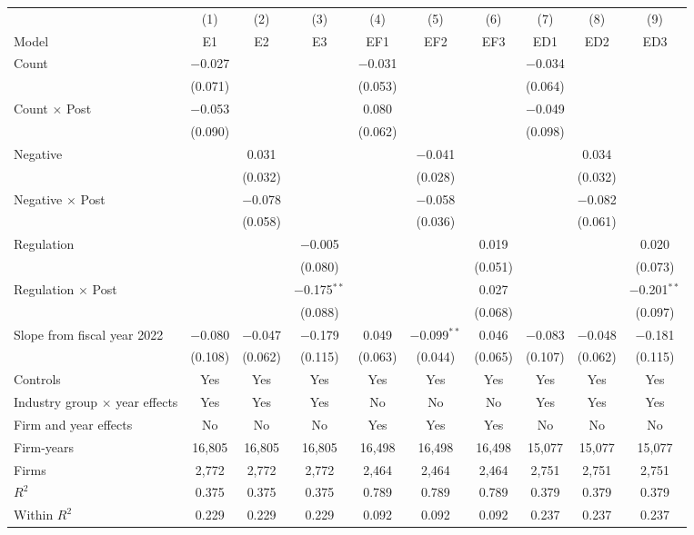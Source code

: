 \begin{tabular}{lccccccccc}
\toprule
 & (1) & (2) & (3) & (4) & (5) & (6) & (7) & (8) & (9) \\
Model & E1 & E2 & E3 & EF1 & EF2 & EF3 & ED1 & ED2 & ED3 \\
\midrule
Count & $-$0.027 &  &  & $-$0.031 &  &  & $-$0.034 &  &  \\
 & (0.071) &  &  & (0.053) &  &  & (0.064) &  &  \\
Count $\times$ Post & $-$0.053 &  &  & 0.080 &  &  & $-$0.049 &  &  \\
 & (0.090) &  &  & (0.062) &  &  & (0.098) &  &  \\
Negative &  & 0.031 &  &  & $-$0.041 &  &  & 0.034 &  \\
 &  & (0.032) &  &  & (0.028) &  &  & (0.032) &  \\
Negative $\times$ Post &  & $-$0.078 &  &  & $-$0.058 &  &  & $-$0.082 &  \\
 &  & (0.058) &  &  & (0.036) &  &  & (0.061) &  \\
Regulation &  &  & $-$0.005 &  &  & 0.019 &  &  & 0.020 \\
 &  &  & (0.080) &  &  & (0.051) &  &  & (0.073) \\
Regulation $\times$ Post &  &  & $-$0.175$^{**}$ &  &  & 0.027 &  &  & $-$0.201$^{**}$ \\
 &  &  & (0.088) &  &  & (0.068) &  &  & (0.097) \\
\addlinespace
Slope from fiscal year 2022 & $-$0.080 & $-$0.047 & $-$0.179 & 0.049 & $-$0.099$^{**}$ & 0.046 & $-$0.083 & $-$0.048 & $-$0.181 \\
 & (0.108) & (0.062) & (0.115) & (0.063) & (0.044) & (0.065) & (0.107) & (0.062) & (0.115) \\
\midrule
Controls & Yes & Yes & Yes & Yes & Yes & Yes & Yes & Yes & Yes \\
Industry group $\times$ year effects & Yes & Yes & Yes & No & No & No & Yes & Yes & Yes \\
Firm and year effects & No & No & No & Yes & Yes & Yes & No & No & No \\
Firm-years & 16,805 & 16,805 & 16,805 & 16,498 & 16,498 & 16,498 & 15,077 & 15,077 & 15,077 \\
Firms & 2,772 & 2,772 & 2,772 & 2,464 & 2,464 & 2,464 & 2,751 & 2,751 & 2,751 \\
$R^2$ & 0.375 & 0.375 & 0.375 & 0.789 & 0.789 & 0.789 & 0.379 & 0.379 & 0.379 \\
Within $R^2$ & 0.229 & 0.229 & 0.229 & 0.092 & 0.092 & 0.092 & 0.237 & 0.237 & 0.237 \\
\bottomrule
\end{tabular}
